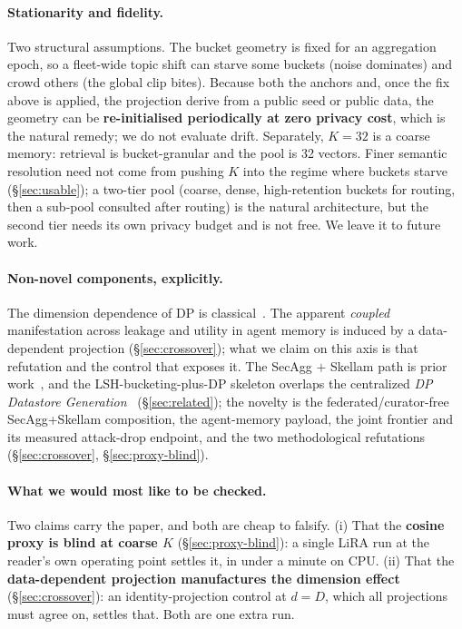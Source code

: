 \documentclass[pdflatex,sn-mathphys-num,12pt]{sn-jnl}
\theoremstyle{thmstyleone}%
\theoremstyle{thmstyletwo}%
\theoremstyle{thmstylethree}%
\newcommand{\secref}[1]{\S\ref{#1}}
\begin{document}
\paragraph{Stationarity and fidelity.} Two structural assumptions. The bucket geometry is fixed for an
aggregation epoch, so a fleet-wide topic shift can starve some buckets (noise dominates) and crowd
others (the global clip bites). Because both the anchors and, once the fix above is applied, the
projection derive from a public seed or public data, the geometry can be \textbf{re-initialised
periodically at zero privacy cost}, which is the natural remedy; we do not evaluate drift. Separately,
$K = 32$ is a coarse memory: retrieval is bucket-granular and the pool is 32 vectors. Finer semantic
resolution need not come from pushing $K$ into the regime where buckets starve (\secref{sec:usable}); a
two-tier pool (coarse, dense, high-retention buckets for routing, then a sub-pool consulted after
routing) is the natural architecture, but the second tier needs its own privacy budget and is not
free. We leave it to future work.

\paragraph{Non-novel components, explicitly.} The dimension dependence of DP is
classical~\cite{chen2022price, bassily2014erm}. The apparent \emph{coupled} manifestation across
leakage and utility in agent memory is induced by a data-dependent projection
(\secref{sec:crossover}); what we claim on this axis is that refutation and the control that
exposes it. The SecAgg $+$ Skellam path is prior
work~\cite{bonawitz2017secagg, agarwal2021skellam, kairouz2021ddgauss}, and the
LSH-bucketing-plus-DP skeleton overlaps the centralized \emph{DP Datastore
Generation}~\cite{abouelenein2026dpdatastore} (\secref{sec:related}); the novelty is the
federated/curator-free SecAgg+Skellam composition, the agent-memory payload, the joint frontier and
its measured attack-drop endpoint, and the two methodological refutations
(\secref{sec:crossover}, \secref{sec:proxy-blind}).

\paragraph{What we would most like to be checked.} Two claims carry the paper, and both are cheap to
falsify. (i) That the \textbf{cosine proxy is blind at coarse $K$} (\secref{sec:proxy-blind}): a
single LiRA run at the reader's own operating point settles it, in under a minute on CPU. (ii) That
the \textbf{data-dependent projection manufactures the dimension effect} (\secref{sec:crossover}): an
identity-projection control at $d = D$, which all projections must agree on, settles that. Both are
one extra run.
\end{document}
